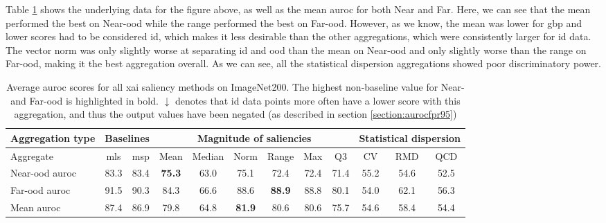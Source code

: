 \documentclass[UKenglish]{uiomasterthesis} %
\theoremstyle{definition}
\begin{document}
Table \ref{table:imagenet200_all_metrics} shows the underlying data for the figure above, as well as the mean \ac{auroc} for both Near and Far. Here, we can see that the mean performed the best on Near-\ac{ood} while the range performed the best on Far-\ac{ood}. However, as we know, the mean was lower for \ac{gbp} and lower scores had to be considered \ac{id}, which makes it less desirable than the other aggregations, which were consistently larger for \ac{id} data. The vector norm was only slightly worse at separating \ac{id} and \ac{ood} than the mean on Near-\ac{ood} and only slightly worse than the range on Far-\ac{ood}, making it the best aggregation overall. As we can see, all the statistical dispersion aggregations showed poor discriminatory power.

\begin{table}[hbtp]
\setlength\tabcolsep{3pt}
\begin{center}
\begin{tabular}{ |p{5.1em}|c c|c c c c c c|c c c| }
    \hline
     \centering Aggregation type & \multicolumn{2}{c|}{Baselines} & \multicolumn{6}{c|}{Magnitude of saliencies} & \multicolumn{3}{p{8em}|}{\centering Statistical dispersion} \\
    \hline
    Aggregate & \ac{mls} & \ac{msp} & Mean & Median & Norm & Range & Max & Q3 & CV & RMD & QCD  \\
    \hline
    \rowcolor{near!50}
    Near-\ac{ood} \ac{auroc} & 83.3 & 83.4 &\textbf{ 75.3 }& 63.0 & 75.1 & 72.4 & 72.4 & 71.4 & 55.2 & 54.6 & 52.5  \\
    \hline
    \rowcolor{far!50}
    Far-\ac{ood} \ac{auroc} & 91.5 & 90.3 & 84.3 & 66.6 & 88.6 &\textbf{ 88.9 }& 88.8 & 80.1 & 54.0 & 62.1 & 56.3  \\
    \hline
    Mean \ac{auroc} & 87.4 & 86.9 & 79.8 & 64.8 &\textbf{ 81.9 }& 80.6 & 80.6 & 75.7 & 54.6 & 58.4 & 54.4  \\
    \hline
    \end{tabular}
    \caption[Average \ac{auroc} scores over all \ac{xai} saliency methods on ImageNet200]{Average \ac{auroc} scores for all \ac{xai} saliency methods on ImageNet200. The highest non-baseline value for Near- and Far-\ac{ood} is highlighted in bold. $\downarrow$ denotes that \ac{id} data points more often have a lower score with this aggregation, and thus the output values have been negated (as described in section \ref{section:aurocfpr95})}
    \label{table:imagenet200_all_metrics}
\end{center}
\setlength\tabcolsep{6pt}
\end{table}
\end{document}
